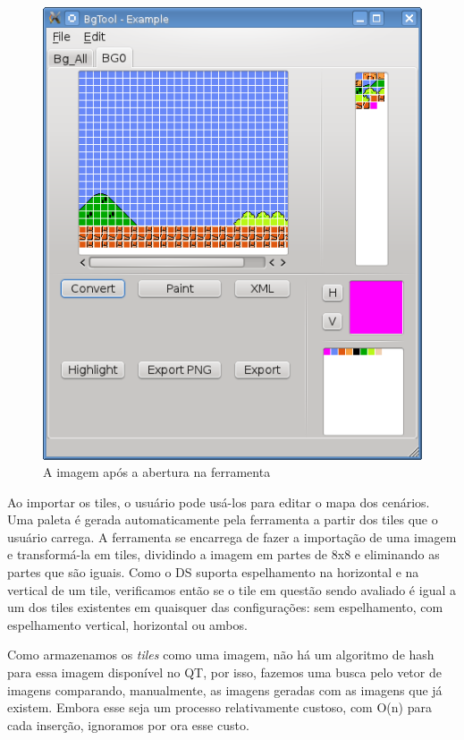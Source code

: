 \documentclass[brazil]{abnt}
\begin{document}
\begin{figure}[h!]
\centering
\includegraphics[scale=1]{imgs/bgtool1.png}
\caption{A imagem após a abertura na ferramenta} 
\end{figure}

Ao importar os tiles, o usuário pode usá-los para editar o mapa dos cenários. Uma paleta é gerada automaticamente pela ferramenta a partir dos tiles que o usuário carrega. A ferramenta se encarrega de fazer a importação de uma imagem e transformá-la em tiles, dividindo a imagem em partes de 8x8 e eliminando as partes que são iguais. Como o DS suporta espelhamento na horizontal e na vertical de um tile, verificamos então se o tile em questão sendo avaliado é igual a um dos tiles existentes em quaisquer das configurações: sem espelhamento, com espelhamento vertical, horizontal ou ambos.

Como armazenamos os \textit{tiles} como uma imagem, não há um algoritmo de hash para essa imagem disponível no QT, por isso, fazemos uma busca pelo vetor de imagens comparando, manualmente, as imagens geradas com as imagens que já existem. Embora esse seja um processo relativamente custoso, com O(n) para cada inserção, ignoramos por ora esse custo.
\end{document}
